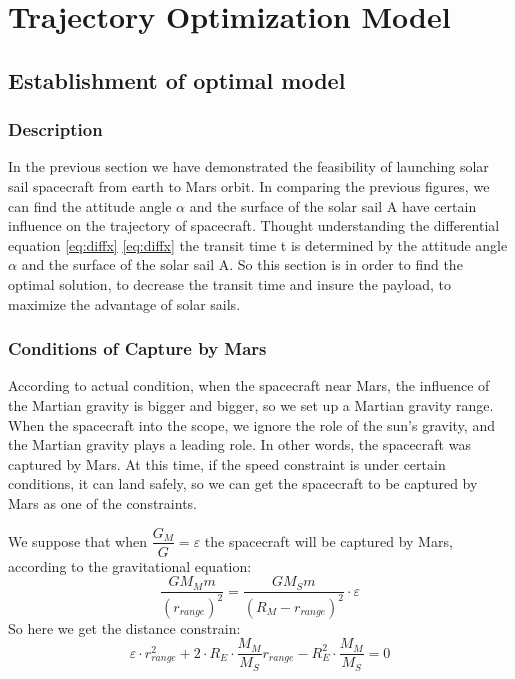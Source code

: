 \documentclass[../Paper.tex]{subfiles}
\begin{document}
\section{Trajectory Optimization Model}

\subsection{Establishment of optimal model}

\subsubsection{Description}

In the previous section we have demonstrated the feasibility of launching solar sail spacecraft from earth to Mars orbit. In comparing the previous figures, we can find the attitude angle $\alpha$ and the surface of the solar sail A have certain influence on the trajectory of spacecraft. Thought understanding the differential equation \eqref{eq:diffx} \eqref{eq:diffx} the transit time t is determined by the attitude angle $\alpha$ and the surface of the solar sail A. So this section is in order to find the optimal solution, to decrease the transit time and insure the payload, to maximize the advantage of solar sails.

\subsubsection{Conditions of Capture by Mars}
According to actual condition, when the spacecraft near Mars, the influence of the Martian gravity is bigger and bigger, so we set up a Martian gravity range. When the spacecraft into the scope, we ignore the role of the sun's gravity, and the Martian gravity plays a leading role. In other words, the spacecraft was captured by Mars.  At this time, if the speed constraint is under certain conditions, it can land safely, so we can get the spacecraft to be captured by Mars as one of the constraints.

We suppose that when $ \dfrac{G_M}{G} = \varepsilon $ the spacecraft will be captured by Mars, according to the gravitational equation:
\begin{equation*}
\frac{G M_{M} m}{(r_{range})^2} = \frac{GM_{S}m}{ (R_{M}-r_{range})^2} \cdot \varepsilon
\end{equation*}
So here we get the distance constrain:
\begin{equation*}
\varepsilon \cdot r_{range}^2 + 2\cdot R_{E} \cdot \dfrac{M_{M}}{M_{S}} r_{range} - R_{E}^2 \cdot \dfrac{M_{M}}{M_{S}} = 0
\end{equation*}
\end{document}

